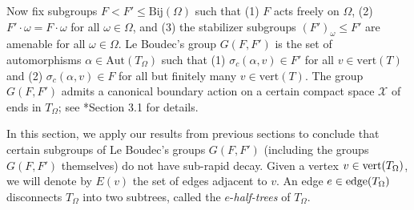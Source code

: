 \documentclass[12pt]{amsart}
\theoremstyle{definition}
\theoremstyle{remark}
\begin{document}
Now fix subgroups $F< F'\leq \text{Bij}(\Omega)$ such that (1) $F$ acts freely on $\Omega$, (2) $F'\cdot \omega = F\cdot \omega$ for all $\omega\in\Omega$, and (3) the stabilizer subgroups $(F')_\omega\leq F'$ are amenable for all $\omega\in\Omega$. Le Boudec's group $G(F, F')$ is the set of automorphisms $\alpha\in \text{Aut}(T_{\Omega})$ such that (1) $\sigma_c(\alpha, v)\in F'$ for all $v\in \text{vert}(T)$ and (2) $\sigma_c(\alpha, v)\in F$ for all but finitely many $v\in \text{vert}(T)$. The group $G(F, F')$ admits a canonical boundary action on a certain compact space $\mathcal{X}$ of ends in $T_{\Omega}$; see \cite{boudec}*{Section 3.1} for details.

In this section, we apply our results from previous sections to conclude that certain subgroups of Le Boudec's groups $G(F, F')$ (including the groups $G(F, F')$ themselves) do not have sub-rapid decay. Given a vertex $v\in \textup{vert}(T_{\Omega})$, we will denote by $E(v)$ the set of edges adjacent to $v$. An edge $e\in \textup{edge}(T_{\Omega})$ disconnects $T_{\Omega}$ into two subtrees, called the $e$-\textit{half-trees} of $T_{\Omega}$.
\end{document}
